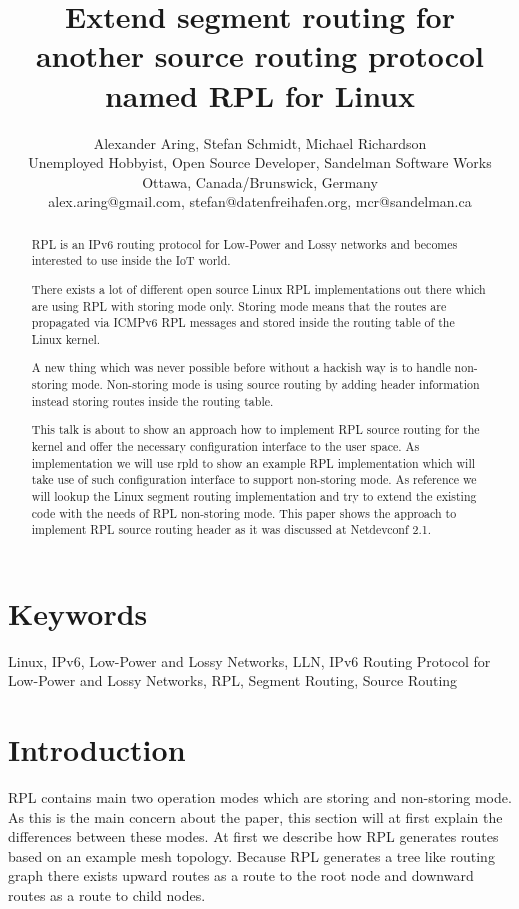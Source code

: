 \documentclass[letterpaper]{article}
\title{Extend segment routing for another source routing protocol named RPL for Linux}
\author{Alexander Aring, Stefan Schmidt, Michael Richardson\\
Unemployed Hobbyist, Open Source Developer, Sandelman Software Works\\
Ottawa, Canada/Brunswick, Germany\\
alex.aring@gmail.com, stefan@datenfreihafen.org, mcr@sandelman.ca\\
\newline
\newline
}
\begin{document}
 
\maketitle
\begin{abstract}
RPL \cite{RFC6550} is an IPv6 routing protocol for Low-Power and Lossy networks and becomes interested to use inside the IoT world.

There exists a lot of different open source Linux RPL implementations out there which are using RPL with storing mode only.
Storing mode means that the routes are propagated via ICMPv6 RPL messages and stored inside the routing table of the Linux kernel.

A new thing which was never possible before without a hackish way is to handle non-storing mode.
Non-storing mode is using source routing by adding header information \cite{RFC6554} instead storing routes inside the routing table.

This talk is about to show an approach how to implement RPL source routing for the kernel and offer the necessary configuration interface to the user space.
As implementation we will use rpld \cite{rpld} to show an example RPL implementation which will take use of such configuration interface to support non-storing mode.
As reference we will lookup the Linux segment routing implementation and try to extend the existing code with the needs of RPL non-storing mode.
This paper shows the approach to implement RPL source routing header as it was discussed at Netdevconf 2.1.
\end{abstract}

\section{Keywords}

Linux, IPv6, Low-Power and Lossy Networks, LLN, IPv6 Routing Protocol for Low-Power and Lossy Networks, RPL, Segment Routing, Source Routing

\section{Introduction}

RPL contains main two operation modes which are storing and non-storing mode.
As this is the main concern about the paper, this section will at first explain the differences between these modes.
At first we describe how RPL generates routes based on an example mesh topology.
Because RPL generates a tree like routing graph there exists upward routes as a route to the root node and downward routes as a route to child nodes.
\end{document}
